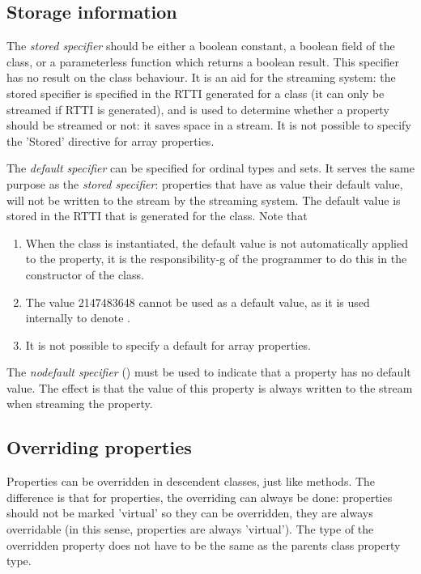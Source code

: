 \subsection{Storage information}
The {\em stored specifier} should be either a boolean constant, a boolean
field of the class, or a parameterless function which returns a boolean
result. This specifier has no result on the class behaviour. It is an aid
for the streaming system: the stored specifier is specified in the RTTI
generated for a class (it can only be streamed if RTTI is generated), 
and is used to determine whether a property should be streamed or not: 
it saves space in a stream. It is not possible to specify the 'Stored'
directive for array properties.

The {\em default specifier} can be specified for ordinal types and sets.
It serves the same purpose as the {\em stored specifier}: properties that
have as value their default value, will not be written to the stream by the
streaming system. The default value is stored in the RTTI that is generated
for the class. Note that
\begin{enumerate}
\item When the class is instantiated, the default value is not automatically
applied to the property, it is the responsibility-g of the programmer to do
this in the constructor of the class.
\item The value 2147483648 cannot be used as a default value, as it is used
internally to denote .
\item It is not possible to specify a default for array properties.
\end{enumerate}

The {\em nodefault specifier} () must be used to indicate 
that a property has no default value. The effect is that the value of this
property is always written to the stream when streaming the property. 

\subsection{Overriding properties}
Properties can be overridden in descendent classes, just like methods. The
difference is that for properties, the overriding can always be done:
properties should not be marked 'virtual' so they can be overridden, they
are always overridable (in this sense, properties are always 'virtual').
The type of the overridden property does not have to be the same as the
parents class property type.

